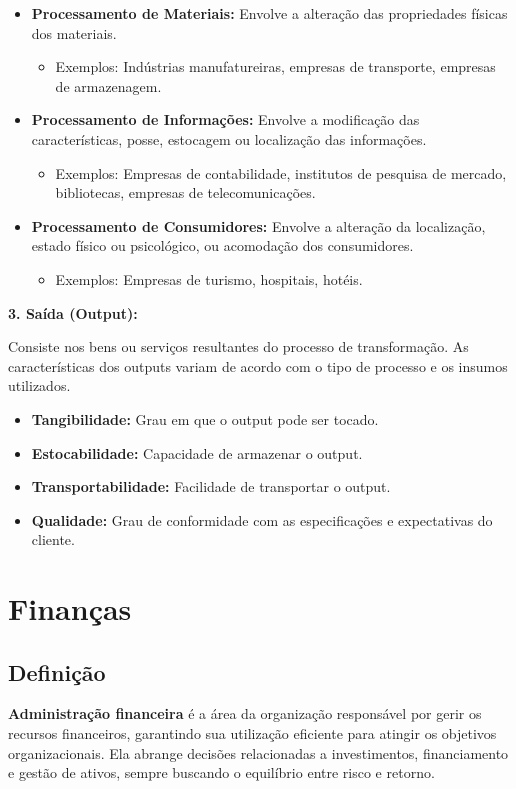 \documentclass{article}
\begin{document}
\begin{itemize}
\item \textbf{Processamento de Materiais:} Envolve a alteração das propriedades físicas dos materiais.
    \begin{itemize}
    \item Exemplos: Indústrias manufatureiras, empresas de transporte, empresas de armazenagem.
    \end{itemize}
\item \textbf{Processamento de Informações:} Envolve a modificação das características, posse, estocagem ou localização das informações.
    \begin{itemize}
    \item Exemplos: Empresas de contabilidade, institutos de pesquisa de mercado, bibliotecas, empresas de telecomunicações.
    \end{itemize}
\item \textbf{Processamento de Consumidores:} Envolve a alteração da localização, estado físico ou psicológico, ou acomodação dos consumidores.
    \begin{itemize}
    \item Exemplos: Empresas de turismo, hospitais, hotéis.
    \end{itemize}
\end{itemize}

\textbf{3. Saída (Output):}

Consiste nos bens ou serviços resultantes do processo de transformação. As características dos outputs variam de acordo com o tipo de processo e os insumos utilizados.

\begin{itemize}
\item \textbf{Tangibilidade:} Grau em que o output pode ser tocado.
\item \textbf{Estocabilidade:} Capacidade de armazenar o output.
\item \textbf{Transportabilidade:} Facilidade de transportar o output.
\item \textbf{Qualidade:} Grau de conformidade com as especificações e expectativas do cliente.
\end{itemize}

\section{Finanças}

\subsection{Definição}
\textbf{Administração financeira} é a área da organização responsável por gerir os recursos financeiros, garantindo sua utilização eficiente para atingir os objetivos organizacionais. Ela abrange decisões relacionadas a investimentos, financiamento e gestão de ativos, sempre buscando o equilíbrio entre risco e retorno.
\end{document}
